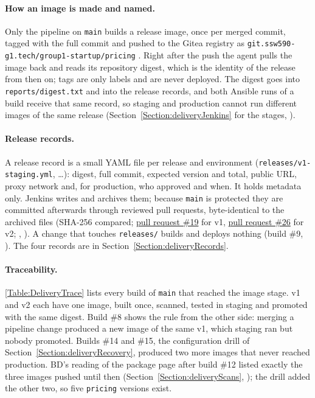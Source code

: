 \paragraph{How an image is made and named.} Only the pipeline on \texttt{main} builds a release image, once per merged commit, tagged with the full commit and pushed to the Gitea registry as
\texttt{git.ssw590-g1.tech/group1-startup/pricing} \cite{GiteaContainerRegistry}. Right after the push the agent pulls the image back and reads its repository digest, which is the identity of the release from then on;
tags are only labels and are never deployed. The digest goes into \texttt{reports/digest.txt} and into the release records, and both Ansible runs of a build receive that same record, so staging and production cannot run different images
of the same release (Section~\ref{Section:deliveryJenkins} for the stages, ).

\paragraph{Release records.} A release record is a small YAML file per release and environment (\texttt{releases/v1-staging.yml}, \ldots): digest, full commit, expected version and total, public URL, proxy network and, for production,
who approved and when. It holds metadata only. Jenkins writes and archives them; because \texttt{main} is protected they are committed afterwards through reviewed pull requests, byte-identical to the archived files
(SHA-256 compared; \href{\GiteaRepoURL/pulls/19}{pull request \#19} for v1, \href{\GiteaRepoURL/pulls/26}{pull request \#26} for v2; , ). A change that touches \texttt{releases/} builds and deploys nothing (build \#9, ).
The four records are in Section~\ref{Section:deliveryRecords}.

\paragraph{Traceability.} \ref{Table:DeliveryTrace} lists every build of \texttt{main} that reached the image stage. v1 and v2 each have one image, built once, scanned, tested in staging and promoted with the same digest.
Build \#8 shows the rule from the other side: merging a pipeline change produced a new image of the same v1, which staging ran but nobody promoted. Builds \#14 and \#15, the configuration drill of Section~\ref{Section:deliveryRecovery}, produced two more images that never reached production. BD's reading of the package page after build \#12 listed exactly the three images pushed until then (Section~\ref{Section:deliveryScans}, ); the drill added the other two, so five \texttt{pricing} versions exist.

